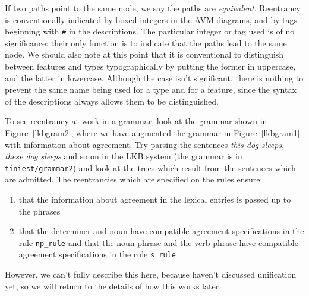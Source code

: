 \documentclass[12pt]{report}
\newcommand{\filename}[1]{{\tt #1}}
\newcommand{\lkbentryname}[1]{{\tt #1}}
\begin{document}
If two paths point to the same node, we say the paths are {\it equivalent}.
Reentrancy is conventionally indicated by boxed integers
in the AVM diagrams, and by tags beginning with \verb+#+
in the descriptions.  The particular integer or tag
used is of no significance: their only function is to indicate
that the paths lead to
the same node.  
We should also note at this point that
it is conventional to distinguish between features and types
typographically by putting the former in uppercase, and the latter 
in lowercase.  Although the case isn't significant, there is nothing
to prevent the same name being used for a type and for a feature,
since the syntax of the descriptions always allows them to be distinguished.

To see reentrancy at work in a grammar, look at the grammar shown
in Figure~\ref{lkbgram2}, where we have augmented the grammar in
Figure~\ref{lkbgram1} with
information about agreement.  Try parsing the sentences {\it this dog sleeps},
{\it these dog sleeps} and so on in the LKB system (the grammar is in
\filename{tiniest/grammar2}) and look at the trees which
result from the sentences which are admitted.
The reentrancies which are specified 
on the rules ensure:
\begin{enumerate}
\item that the information about agreement in the lexical entries
is passed up to the phrases
\item that the determiner and noun have compatible agreement specifications
in the rule \lkbentryname{np\_rule} and that the noun phrase and the verb phrase
have compatible agreement specifications
in the rule \lkbentryname{s\_rule}
\end{enumerate}
However, we can't fully describe this here, because
haven't discussed unification yet, so we
will return to the details of how this works later.
\end{document}
